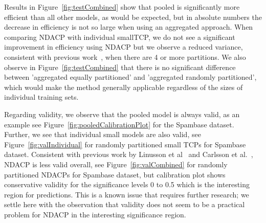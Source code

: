 \documentclass[main]{subfiles}
\begin{document}
Results in Figure~\ref{fig:testCombined} show that pooled is significantly more efficient than all other models, as would be expected, but in absolute numbers the decrease in efficiency is not so large when using an aggregated approach. When comparing NDACP with individual smallTCP, we do not see a significant improvement in efficiency using NDACP but we observe a reduced variance, consistent with previous work~\cite{Carlsson:2014qr}, when there are 4 or more partitions. We also observe in Figure~\ref{fig:testCombined} that there is no significant difference between 'aggregated equally partitioned' and 'aggregated randomly partitioned', which would make the method generally applicable regardless of the sizes of individual training sets.


Regarding validity, we observe that the pooled model is always valid, as an example see Figure~\ref{fig:pooledCalibrationPlot} for the Spambase dataset. Further, we see that individual small models are also valid, see Figure~\ref{fig:valIndividual} for randomly partitioned small TCPs for Spambase dataset. Consistent with previous work by Linusson et al~\cite{Linusson:2017dn} and Carlsson et al.~\cite{Carlsson:2014qr}, NDACP is less valid overall, see Figure~\ref{fig:valCombined} for randomly partitioned NDACPs for Spambase dataset, but calibration plot shows conservative validity for the significance levels 0 to 0.5 which is the interesting region for predictions. This is a known issue that requires further research; we settle here with the observation that validity does not seem to be a practical problem for NDACP in the interesting significance region.
\end{document}
